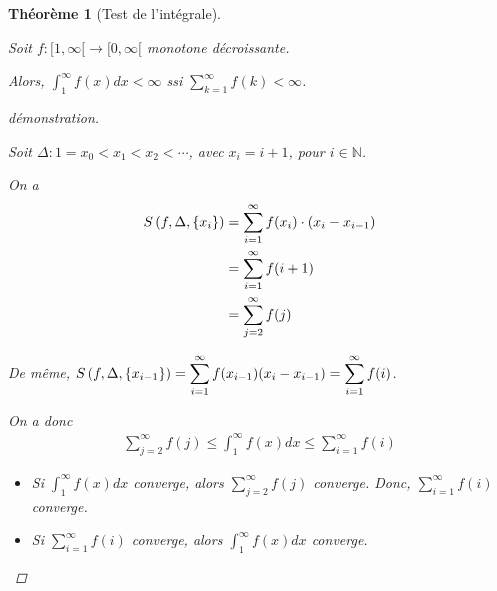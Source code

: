 \documentclass{report}
\newcommand*{\dsum}[4]{\displaystyle\sum_{#1=#2}^{#3}#4}
\newcommand*{\dint}[3]{\displaystyle\int_{#1}^{#2}#3}
\newcommand*{\naturels}{\mathbb{N}}
\newtheorem*{thm}{Th\'eor\`eme}
\theoremstyle{definition}
\theoremstyle{remark}
\begin{document}
	\begin{thm}[Test de l'int\'egrale]~

		Soit $f: [1,\infty[ \to [0,\infty[$ monotone d\'ecroissante.

		Alors, $\displaystyle\int_{1}^{\infty}f(x)dx < \infty$ ssi $\displaystyle\sum_{k=1}^{\infty} f(k) < \infty$.
		\begin{proof}[d\'emonstration]~

			Soit $\Delta: 1 = x_0 < x_1 < x_2 < \dotsb$, avec $x_i=i+1$, pour $i \in \naturels$.

			On a
			\begin{align*}
				\srie{f}[\Delta][\{x_i\}]&= \sum_{i=1}^{\infty} f(x_i) \cdot (x_i-x_{i-1})\\
				&= \sum_{i=1}^{\infty} f(i+1)\\
				&= \sum_{j=2}^{\infty} f(j)
			\end{align*}

			De m\^eme, $\srie{f}[\Delta][\{x_{i-1}\}] = \dsum{i}{1}{\infty}{f(x_{i-1})} (x_i-x_{i-1}) = \dsum{i}{1}{\infty}{f(i)}$.

			On a donc
			\begin{align*}
			\sum_{j=2}^\infty f(j) \leq \int_{1}^{\infty} f(x)dx \leq \sum_{i=1}^\infty f(i)
			\end{align*}
			\begin{itemize}
			\item[$(\Rightarrow)$] Si $\dint{1}{\infty}{f(x)dx}$ converge, alors $\dsum{j}{2}{\infty}{f(j)}$ converge. Donc, $\dsum{i}{1}{\infty}{f(i)}$ converge.
			\item[$(\Leftarrow)$] Si $\dsum{i}{1}{\infty}{f(i)}$ converge, alors $\dint{1}{\infty}{f(x)dx}$ converge.
			\end{itemize}
		\end{proof}
	\end{thm}
\end{document}
